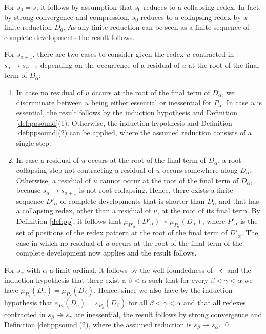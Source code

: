 \documentclass{LMCS}
\theoremstyle{plain}
\theoremstyle{definition}
\newcommand{\rew}{\rightarrow}
\newcommand{\trewt}{\twoheadrightarrow}
\newcommand{\pmap}{\varepsilon}
\newcommand{\pmapp}[2]{\pmap_{#1}({#2})}
\newcommand{\pme}{\mu}
\newcommand{\pmep}[2]{\pme_{#1}({#2})}
\begin{document}
For $s_0 = s$, it follows by assumption that $s_0$ reduces to a collapsing redex. In fact, by strong convergence and compression, $s_0$ reduces to a collapsing redex by a finite reduction $D_0$. As any finite reduction can be seen as a finite sequence of complete developments the result follows.

For $s_{\alpha + 1}$, there are two cases to consider given the redex $u$ contracted in $s_\alpha \rew s_{\alpha + 1}$ depending on the occurrence of a residual of $u$ at the root of the final term of $D_\alpha$:
\begin{enumerate}[$\bullet$]
\item
In case no residual of $u$ occurs at the root of the final term of
$D_\alpha$, we discriminate between $u$ being either essential or
inessential for $P_\alpha$. In case $u$ is essential, the result
follows by the induction hypothesis and Definition
\ref{def:ppsound}(1).  Otherwise, the induction hypothesis and
Definition \ref{def:ppsound}(2) can be applied, where the assumed
reduction consists of a single step.

\item
In case a residual of $u$ occurs at the root of the final term of $D_\alpha$, a root-collapsing step not contracting a residual of $u$ occurs somewhere along $D_\alpha$. Otherwise, a residual of $u$ cannot occur at the root of the final term of $D_\alpha$, because $s_\alpha \rew s_{\alpha + 1}$ is not root-collapsing. Hence, there exists a finite sequence $D'_\alpha$ of complete developments that is shorter than $D_\alpha$ and that has a collapsing redex, other than a residual of $u$, at the root of its final term. By Definition \ref{def:pp}, it follows that $\pmep{P'_\alpha}{D'_\alpha} \prec \pmep{P_\alpha}{D_\alpha}$, where $P'_\alpha$ is the set of positions of the redex pattern at the root of the final term of $D'_\alpha$. The case in which no residual of $u$ occurs at the root of the final term of the complete development now applies and the result follows.
\end{enumerate}

For $s_\alpha$ with $\alpha$ a limit ordinal, it follows by the well-foundedness of $\prec$ and the induction hypothesis that there exist a $\beta < \alpha$ such that for every $\beta < \gamma < \alpha$ we have $\pmep{P_\gamma}{D_\gamma} = \pmep{P_\beta}{D_\beta}$. Hence, since we also have by the induction hypothesis that $\pmapp{P_\gamma}{D_\gamma} = \pmapp{P_\beta}{D_\beta}$ for all $\beta < \gamma < \alpha$ and that all redexes contracted in $s_\beta \trewt s_\gamma$ are inessential, the result follows by strong convergence and Definition \ref{def:ppsound}(2), where the assumed reduction is $s_\beta \trewt s_\alpha$. \qed
\end{document}
